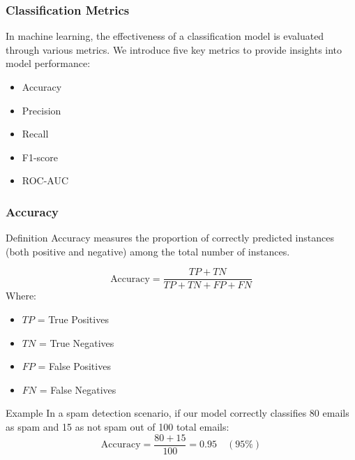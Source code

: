 \documentclass{beamer}
\begin{document}
\begin{frame}[fragile]
    \frametitle{Classification Metrics}
    In machine learning, the effectiveness of a classification model is evaluated through various metrics. We introduce five key metrics to provide insights into model performance:
    \begin{itemize}
        \item Accuracy
        \item Precision
        \item Recall
        \item F1-score
        \item ROC-AUC
    \end{itemize}
\end{frame}

\begin{frame}[fragile]
    \frametitle{Accuracy}
    \begin{block}{Definition}
        Accuracy measures the proportion of correctly predicted instances (both positive and negative) among the total number of instances.
    \end{block}

    \begin{equation}
        \text{Accuracy} = \frac{TP + TN}{TP + TN + FP + FN}
    \end{equation}
    Where:
    \begin{itemize}
        \item $TP$ = True Positives
        \item $TN$ = True Negatives
        \item $FP$ = False Positives
        \item $FN$ = False Negatives
    \end{itemize}

    \begin{block}{Example}
        In a spam detection scenario, if our model correctly classifies 80 emails as spam and 15 as not spam out of 100 total emails:
        \[
        \text{Accuracy} = \frac{80 + 15}{100} = 0.95 \quad (95\%)
        \]
    \end{block}
\end{frame}
\end{document}
